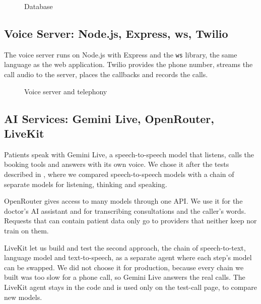 \begin{figure}[H]
    \centering
    \hspace{1cm}
    \caption{Database}
    \label{fig:logos_database}
\end{figure}

\subsection{Voice Server: Node.js, Express, ws, Twilio}
The voice server runs on Node.js with Express and the \texttt{ws} library, the same language as the web application. Twilio provides the phone number, streams the call audio to the server, places the callbacks and records the calls.

\begin{figure}[H]
    \centering
    \hspace{1cm}
    \hspace{1cm}
    \caption{Voice server and telephony}
    \label{fig:logos_voice}
\end{figure}

\subsection{AI Services: Gemini Live, OpenRouter, LiveKit}
Patients speak with Gemini Live, a speech-to-speech model that listens, calls the booking tools and answers with its own voice. We chose it after the tests described in , where we compared speech-to-speech models with a chain of separate models for listening, thinking and speaking.

OpenRouter gives access to many models through one API. We use it for the doctor's AI assistant and for transcribing consultations and the caller's words. Requests that can contain patient data only go to providers that neither keep nor train on them.

LiveKit let us build and test the second approach, the chain of speech-to-text, language model and text-to-speech, as a separate agent where each step's model can be swapped. We did not choose it for production, because every chain we built was too slow for a phone call, so Gemini Live answers the real calls. The LiveKit agent stays in the code and is used only on the test-call page, to compare new models.

